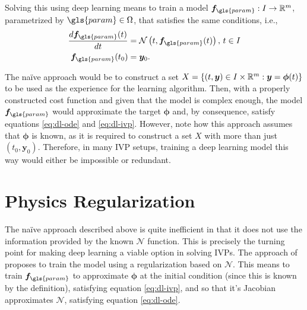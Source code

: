 Solving this using deep learning means to train a model $\bm{f}_{\gls{param}}:I\to \R^{m}$, parametrized by $\gls{param}\in \Omega$, that satisfies the same conditions, i.e.,
\begin{align}
    \frac{d \bm{f}_{\gls{param}}(t)}{d t} &= \mathcal{N}\left( t, \bm{f}_{\gls{param}}(t) \right),\,t\in I \label{eq:dl-ode} \\
    \bm{f}_{\gls{param}}(t_0) &= \bm{y}_0 \label{eq:dl-ivp}
.\end{align}

The naïve approach would be to construct a set $X=\left\{ (t,\bm{y})\in I\times \mathbb{R}^{m}: \bm{y}=\bm{\phi}(t) \right\} $ to be used as the experience for the learning algorithm.
Then, with a properly constructed cost function and given that the model is complex enough, the model $\bm{f}_{\gls{param}}$ would approximate the target $\bm{\phi}$ and, by consequence, satisfy equations \eqref{eq:dl-ode} and \eqref{eq:dl-ivp}.
However, note how this approach assumes that $\bm{\phi}$ is known, as it is required to construct a set $X$ with more than just $\left( t_0,\bm{y}_0 \right) $.
Therefore, in many \gls{IVP} setups, training a deep learning model this way would either be impossible or redundant.

\section{Physics Regularization}

The naïve approach described above is quite inefficient in that it does not use the information provided by the known $\mathcal{N}$ function.
This is precisely the turning point for making deep learning a viable option in solving \gls{IVP}s.
The approach of \textcite{Raissi2019} proposes to train the model using a regularization based on $\mathcal{N}$.
This means to train $\bm{f}_{\gls{param}}$ to approximate $\bm{\phi}$ at the initial condition (since this is known by the definition), satisfying equation \eqref{eq:dl-ivp}, and so that it's Jacobian approximates $\mathcal{N}$, satisfying equation \eqref{eq:dl-ode}.

